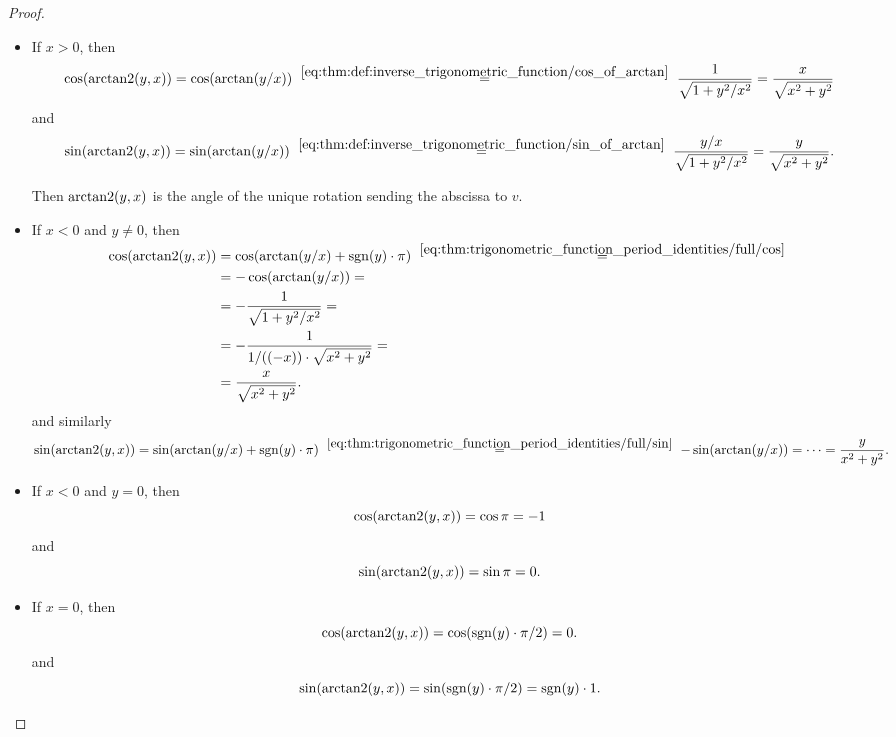 \begin{proof}
  \hfill
  \begin{itemize}
    \item If \( x > 0 \), then
    \begin{equation*}
      \cos(\arctantwo(y, x))
      =
      \cos(\arctan(y / x))
      \reloset {\eqref{eq:thm:def:inverse_trigonometric_function/cos_of_arctan}} =
      \frac 1 {\sqrt{1 + y^2 / x^2}}
      =
      \frac x {\sqrt{x^2 + y^2}}
    \end{equation*}
    and
    \begin{equation*}
      \sin(\arctantwo(y, x))
      =
      \sin(\arctan(y / x))
      \reloset {\eqref{eq:thm:def:inverse_trigonometric_function/sin_of_arctan}} =
      \frac {y / x} {\sqrt{1 + y^2 / x^2}}
      =
      \frac y {\sqrt{x^2 + y^2}}.
    \end{equation*}

    Then \( \operatorname{arctan2}(y, x) \) is the angle of the unique rotation sending the abscissa to \( v \).

    \item If \( x < 0 \) and \( y \neq 0 \), then
    \begin{align*}
      \cos(\arctantwo(y, x))
      &=
      \cos(\arctan(y / x) + \sgn(y) \cdot \pi)
      \reloset {\eqref{eq:thm:trigonometric_function_period_identities/full/cos}} = \\ &=
      -\cos(\arctan(y / x))
      = \\ &=
      -\frac 1 {\sqrt{1 + y^2 / x^2}}
      = \\ &=
      -\frac 1 {1 / ((-x)) \cdot \sqrt{x^2 + y^2}}
      = \\ &=
      \frac x {\sqrt{x^2 + y^2}}.
    \end{align*}
    and similarly
    \begin{equation*}
      \sin(\arctantwo(y, x))
      =
      \sin(\arctan(y / x)  + \sgn(y) \cdot \pi)
      \reloset {\eqref{eq:thm:trigonometric_function_period_identities/full/sin}} =
      -\sin(\arctan(y / x))
      =
      \cdots
      =
      \frac y {x^2 + y^2}.
    \end{equation*}

    \item If \( x < 0 \) and \( y = 0 \), then
    \begin{equation*}
      \cos(\operatorname{arctan2}(y, x)) = \cos \pi = -1
    \end{equation*}
    and
    \begin{equation*}
      \sin(\operatorname{arctan2}(y, x)) = \sin \pi = 0.
    \end{equation*}

    \item If \( x = 0 \), then
    \begin{equation*}
      \cos(\operatorname{arctan2}(y, x)) = \cos(\operatorname{sgn}(y) \cdot \pi / 2) = 0.
    \end{equation*}
    and
    \begin{equation*}
      \sin(\operatorname{arctan2}(y, x)) = \sin(\operatorname{sgn}(y) \cdot \pi / 2) = \operatorname{sgn}(y) \cdot 1.
    \end{equation*}
  \end{itemize}
\end{proof}

